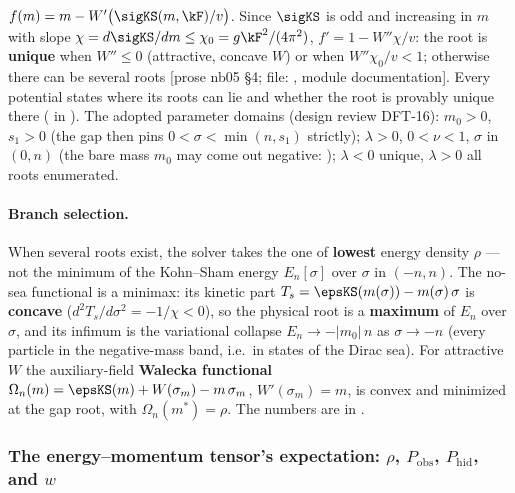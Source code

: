$f(m)=m-W'\bigl(\sigKS(m,\kF)/v\bigr)$. Since $\sigKS$ is odd and increasing in $m$ with slope
$\chi=d\sigKS/dm\leq\chi_0=g\kF^2/(4\pi^2)$, $f'=1-W''\chi/v$: the root is \textbf{unique} when $W''\leq0$
(attractive, concave $W$) or when $W''\chi_0/v<1$; otherwise there can be several roots [prose nb05 \S4;
file: , module documentation]. Every potential states where its roots can lie and
whether the root is provably unique there ( in ). The
adopted parameter domains (design review DFT-16):  $m_0>0$, $s_1>0$ (the gap then pins
$0<\sigma<\min(n,s_1)$ strictly);  $\lambda>0$, $0<\nu<1$, $\sigma$ in $(0,n)$ (the bare mass
$m_0$ may come out negative: );  $\lambda<0$ unique, $\lambda>0$ all
roots enumerated.

\paragraph{Branch selection.} When several roots exist, the solver takes the one of \textbf{lowest}
energy density $\rho$ --- not the minimum of the Kohn--Sham energy $E_n[\sigma]$ over $\sigma$ in $(-n,n)$.
The no-sea functional is a minimax: its kinetic part $T_s=\epsKS(m(\sigma))-m(\sigma)\,\sigma$ is
\textbf{concave} ($d^2T_s/d\sigma^2=-1/\chi<0$), so the physical root is a \textbf{maximum} of $E_n$ over
$\sigma$, and its infimum is the variational collapse $E_n\to-|m_0|\,n$ as $\sigma\to-n$ (every particle
in the negative-mass band, i.e.\ in states of the Dirac sea). For attractive $W$ the auxiliary-field
\textbf{Walecka functional} $\Omega_n(m)=\epsKS(m)+W(\sigma_m)-m\,\sigma_m$, $W'(\sigma_m)=m$, is convex and
minimized at the gap root, with $\Omega_n(m^*)=\rho$. The numbers are in .

\subsubsection{The energy--momentum tensor's expectation: \texorpdfstring{$\rho$, $P_{\mathrm{obs}}$, $P_{\mathrm{hid}}$}{rho, P\_obs, P\_hid}, and \texorpdfstring{$w$}{w}}
\label{sec:4.5.4}

